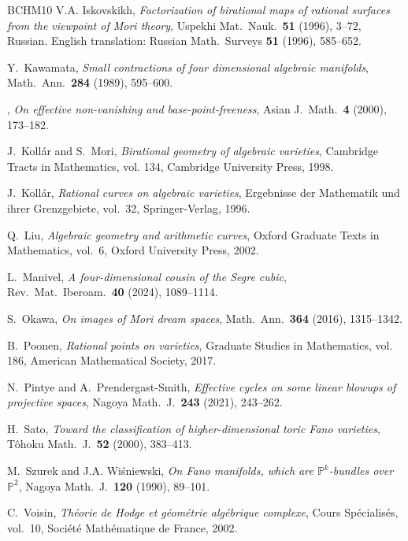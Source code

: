\documentclass[a4paper,12pt]{amsart}
\theoremstyle{definition}
\numberwithin{figure}{section}
\numberwithin{table}{section}
\newcommand{\pr}{\mathbb{P}}
\begin{document}
\begin{thebibliography}{BCHM10}
V.A. Iskovskikh, \emph{Factorization of birational maps of rational surfaces
  from the viewpoint of {M}ori theory}, Uspekhi Mat.\ Nauk.\ \textbf{51}
  (1996), 3--72, Russian. English translation: Russian Math.\ Surveys {\bf 51}
  (1996), 585--652.

Y.~Kawamata, \emph{Small contractions of four dimensional algebraic manifolds},
  Math.\ Ann.\ \textbf{284} (1989), 595--600.

\bysame, \emph{On effective non-vanishing and base-point-freeness}, Asian J.\
  Math.\ \textbf{4} (2000), 173--182.

J.~Koll{\'a}r and S.~Mori, \emph{Birational geometry of algebraic varieties},
  Cambridge Tracts in Mathematics, vol. 134, Cambridge University Press, 1998.

J.~Koll{\'a}r, \emph{Rational curves on algebraic varieties}, Ergebnisse der
  Mathematik und ihrer Grenzgebiete, vol.~32, Springer-Verlag, 1996.

Q.~Liu, \emph{Algebraic geometry and arithmetic curves}, Oxford Graduate Texts
  in Mathematics, vol.~6, Oxford University Press, 2002.

L.~Manivel, \emph{A four-dimensional cousin of the {S}egre cubic}, Rev.\ Mat.\
  Iberoam.\ \textbf{40} (2024), 1089--1114.

S.~Okawa, \emph{On images of {M}ori dream spaces}, Math.\ Ann.\ \textbf{364}
  (2016), 1315--1342.

B.~Poonen, \emph{Rational points on varieties}, Graduate Studies in
  Mathematics, vol. 186, American Mathematical Society, 2017.

N.~Pintye and A.~Prendergast-Smith, \emph{Effective cycles on some linear
  blowups of projective spaces}, Nagoya Math.\ J.\ \textbf{243} (2021),
  243--262.

H.~Sato, \emph{Toward the classification of higher-dimensional toric {F}ano
  varieties}, T{\^o}hoku Math.\ J.\ \textbf{52} (2000), 383--413.

\bibitem[SW90]{szurekwisnnagoya}
M.~Szurek and J.A. Wi{\'s}niewski, \emph{On {F}ano manifolds, which are
  {$\pr^k$}-bundles over {$\pr^2$}}, Nagoya Math.\ J.\ \textbf{120} (1990),
  89--101.

C.~Voisin, \emph{Th{\'e}orie de {H}odge et g{\'e}om{\'e}trie alg{\'e}brique
  complexe}, Cours Sp{\'e}cialis{\'e}s, vol.~10, Soci{\'e}t{\'e}
  Math{\'e}matique de France, 2002.


\end{thebibliography}
\end{document}
